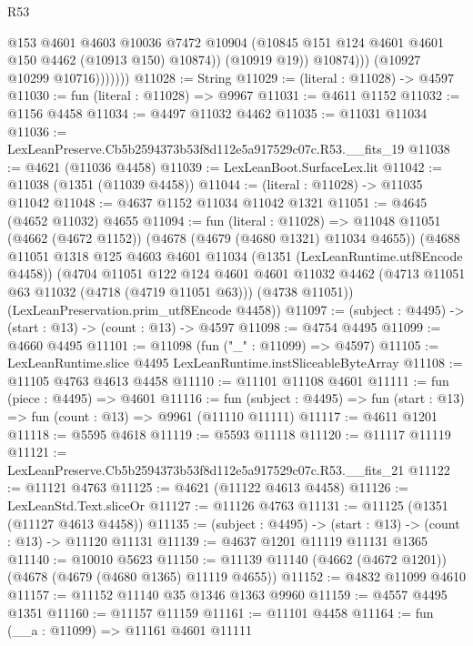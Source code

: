 \begin{lexlean}{R53}
\begin{coremodule}
                          @153
                          @4601
                          @4603
                          @10036
                          @7472
                          @10904
                          (@10845 @151 @124 @4601 @4601 @150 @4462 (@10913 @150) @10874))
                        (@10919 @19))
                      @10874)))
                (@10927 @10299 @10716)))))))
@11028 := String
@11029 := (literal : @11028) -> @4597
@11030 := fun (literal : @11028) => @9967
@11031 := @4611 @1152
@11032 := @1156 @4458
@11034 := @4497 @11032 @4462
@11035 := @11031 @11034
@11036 := LexLeanPreserve.Cb5b2594373b53f8d112e5a917529c07c.R53.__fits_19
@11038 := @4621 (@11036 @4458)
@11039 := LexLeanBoot.SurfaceLex.lit
@11042 := @11038 (@1351 (@11039 @4458))
@11044 := (literal : @11028) -> @11035 @11042
@11048 := @4637 @1152 @11034 @11042 @1321
@11051 := @4645 (@4652 @11032) @4655
@11094 := fun (literal : @11028) =>
  @11048
    @11051
    (@4662 (@4672 @1152))
    (@4678 (@4679 (@4680 @1321) @11034 @4655))
    (@4688
      @11051
      @1318
      @125
      @4603
      @4601
      @11034
      (@1351 (LexLeanRuntime.utf8Encode @4458))
      (@4704
        @11051
        @122
        @124
        @4601
        @4601
        @11032
        @4462
        (@4713 @11051 @63 @11032 (@4718 (@4719 @11051 @63)))
        (@4738 @11051))
      (LexLeanPreservation.prim_utf8Encode @4458))
@11097 := (subject : @4495) -> (start : @13) -> (count : @13) -> @4597
@11098 := @4754 @4495
@11099 := @4660 @4495
@11101 := @11098 (fun ("_" : @11099) => @4597)
@11105 := LexLeanRuntime.slice @4495 LexLeanRuntime.instSliceableByteArray
@11108 := @11105 @4763 @4613 @4458
@11110 := @11101 @11108 @4601
@11111 := fun (piece : @4495) => @4601
@11116 := fun (subject : @4495) => fun (start : @13) => fun (count : @13) => @9961 (@11110 @11111)
@11117 := @4611 @1201
@11118 := @5595 @4618
@11119 := @5593 @11118
@11120 := @11117 @11119
@11121 := LexLeanPreserve.Cb5b2594373b53f8d112e5a917529c07c.R53.__fits_21
@11122 := @11121 @4763
@11125 := @4621 (@11122 @4613 @4458)
@11126 := LexLeanStd.Text.sliceOr
@11127 := @11126 @4763
@11131 := @11125 (@1351 (@11127 @4613 @4458))
@11135 := (subject : @4495) -> (start : @13) -> (count : @13) -> @11120 @11131
@11139 := @4637 @1201 @11119 @11131 @1365
@11140 := @10010 @5623
@11150 := @11139 @11140 (@4662 (@4672 @1201)) (@4678 (@4679 (@4680 @1365) @11119 @4655))
@11152 := @4832 @11099 @4610
@11157 := @11152 @11140 @35 @1346 @1363 @9960
@11159 := @4557 @4495 @1351
@11160 := @11157 @11159
@11161 := @11101 @4458
@11164 := fun (__a : @11099) => @11161 @4601 @11111

\end{coremodule}
\end{lexlean}
